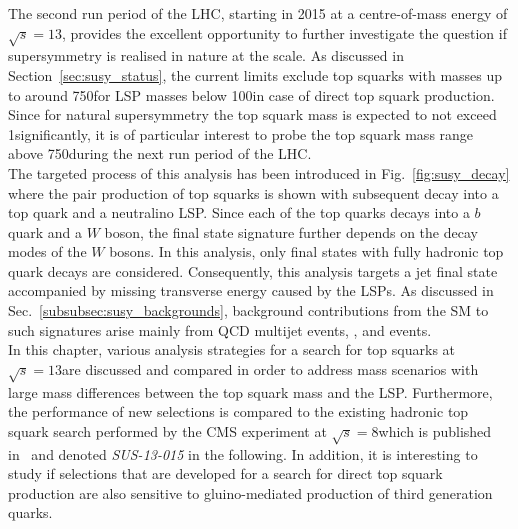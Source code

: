The second run period of the LHC, starting in 2015 at a centre-of-mass energy of $\sqrt{s} = 13$\tev, provides the excellent opportunity to further investigate the question if supersymmetry is realised in nature at the \tev scale. As discussed in Section~\ref{sec:susy_status}, the current limits exclude top squarks with masses up to around 750\gev for LSP masses below 100\gev in case of direct top squark production. Since for natural supersymmetry the top squark mass is expected to not exceed 1\tev significantly, it is of particular interest to probe the top squark mass range above 750\gev during the next run period of the LHC. \\
The targeted process of this analysis has been introduced in Fig.~\ref{fig:susy_decay} where the pair production of top squarks is shown with subsequent decay into a top quark and a neutralino LSP. Since each of the top quarks decays into a $b$ quark and a $W$ boson, the final state signature further depends on the decay modes of the $W$ bosons. In this analysis, only final states with fully hadronic top quark decays are considered. Consequently, this analysis targets a jet final state accompanied by missing transverse energy caused by the LSPs. As discussed in Sec.~\ref{subsubsec:susy_backgrounds}, background contributions from the SM to such signatures arise mainly from QCD multijet events, \WJets, \ZJets and \ttbar events. \\
In this chapter, various analysis strategies for a search for top squarks at $\sqrt{s} = 13$\tev are discussed and compared in order to address mass scenarios with large mass differences between the top squark mass and the LSP. Furthermore, the performance of new selections is compared to the existing hadronic top squark search performed by the CMS experiment at $\sqrt{s} = 8$\tev which is published in~\cite{CMS-PAS-SUS-13-015} and denoted \textit{SUS-13-015} in the following. In addition, it is interesting to study if selections that are developed for a search for direct top squark production are also sensitive to gluino-mediated production of third generation quarks.   

